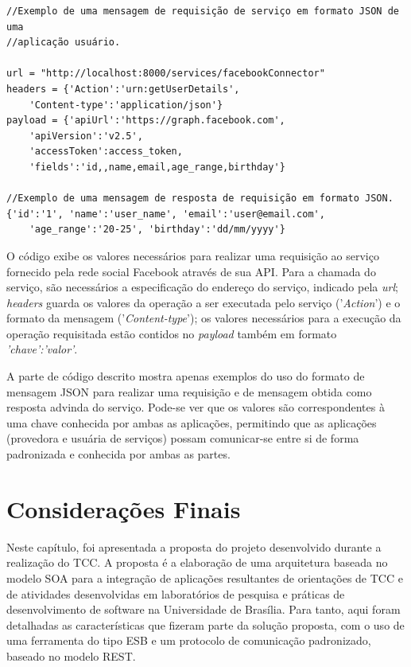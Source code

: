 \begin{lstlisting}
//Exemplo de uma mensagem de requisição de serviço em formato JSON de uma 
//aplicação usuário.

url = "http://localhost:8000/services/facebookConnector"
headers = {'Action':'urn:getUserDetails', 
	'Content-type':'application/json'}
payload = {'apiUrl':'https://graph.facebook.com', 
	'apiVersion':'v2.5',
	'accessToken':access_token,
	'fields':'id,,name,email,age_range,birthday'}

//Exemplo de uma mensagem de resposta de requisição em formato JSON.
{'id':'1', 'name':'user_name', 'email':'user@email.com', 
	'age_range':'20-25', 'birthday':'dd/mm/yyyy'}
\end{lstlisting}

O código exibe os valores necessários para realizar uma requisição ao serviço fornecido pela rede social Facebook através de sua API. Para a chamada do serviço, são necessários a especificação do endereço do serviço, indicado pela \textit{url}; \textit{headers} guarda os valores da operação a ser executada pelo serviço ('\textit{Action}') e o formato da mensagem ('\textit{Content-type}'); os valores necessários para a execução da operação requisitada estão contidos no \textit{payload} também em formato \textit{{'chave':'valor'}}.

A parte de código descrito mostra apenas exemplos do uso do formato de mensagem JSON para realizar uma requisição e de mensagem obtida como resposta advinda do serviço. Pode-se ver que os valores são correspondentes à uma chave conhecida por ambas as aplicações, permitindo que as aplicações (provedora e usuária de serviços) possam comunicar-se entre si de forma padronizada e conhecida por ambas as partes.

\section{Considerações Finais}
Neste capítulo, foi apresentada a proposta do projeto desenvolvido durante a realização do TCC. A proposta é a elaboração de uma arquitetura baseada no modelo SOA para a integração de aplicações resultantes de orientações de TCC e de atividades  desenvolvidas em laboratórios de pesquisa e práticas de desenvolvimento de software na Universidade de Brasília. Para tanto, aqui foram detalhadas as características que fizeram parte da solução proposta, com o uso de uma ferramenta do tipo ESB e um protocolo de comunicação padronizado, baseado no modelo REST.

